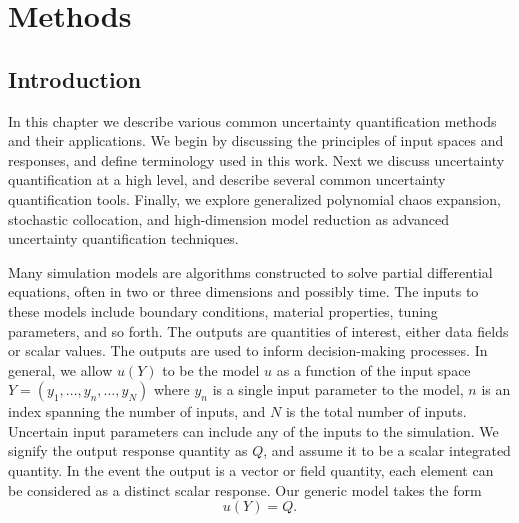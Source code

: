 
\chapter{Methods} %

\label{Chapter3} %



\section{Introduction}
In this chapter we describe various common uncertainty quantification methods and their applications. We begin
by discussing the principles of input spaces and responses, and define terminology used in this work.  Next we
discuss uncertainty quantification at a high level, and describe several common uncertainty quantification
tools.  Finally, we explore generalized polynomial chaos expansion, stochastic collocation, and high-dimension
model reduction as advanced uncertainty quantification techniques.

Many simulation models are algorithms constructed to solve partial differential equations, often in two or
three dimensions and possibly time.  The inputs to these models include boundary conditions, material
properties, tuning parameters, and so forth.  The outputs are quantities of interest, either data fields or
scalar values.  The outputs are used to inform decision-making processes.  In general, we allow $u(Y)$ to be
the model $u$ as a function of the input space $Y = (y_1,\ldots,y_n,\ldots,y_N)$ where $y_n$ is a single input
parameter to the model, $n$ is an index spanning the number of inputs, and $N$ is the total number of inputs.
Uncertain input parameters can include any of the inputs to the simulation.
We signify the output response quantity as $Q$, and assume it to be a scalar integrated quantity.  In the event
the output is a vector or field quantity, each element can be considered as a distinct scalar response.
Our generic model takes the form
\begin{equation}
  u(Y) = Q.
\end{equation}

